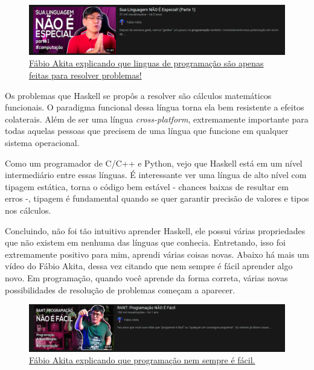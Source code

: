 \documentclass[
  12pt,				         %
  oneside,			       %
  a4paper,			       %
  english,		       	 %
  brazil,			      	 %
]{abntex2}
\begin{document}
\begin{apendicesenv}
        \begin{figure}[ht]
          \includegraphics[width =\textwidth]{fabio_akita_lingua.png}
          \caption{\href{https://www.youtube.com/watch?v=p9-WuJbVHHc}{Fábio Akita explicando que linguas de programação são apenas feitas para resolver problemas!}}
        \end{figure}

        Os problemas que Haskell se propôs a resolver são cálculos matemáticos
        funcionais. O paradigma funcional dessa língua torna ela bem resistente a efeitos colaterais. Além de ser uma língua
        \emph{cross-platform}, extremamente importante para todas aquelas pessoas que precisem de uma língua que funcione
        em qualquer sistema operacional. 

        Como um programador de C/C++ e Python, vejo que Haskell está em um nível intermediário entre essas línguas.
        É interessante ver uma língua de alto nível com tipagem estática, torna o código bem estável - chances baixas de 
        resultar em erros -, tipagem é fundamental quando se quer garantir precisão de valores e tipos nos cálculos.

        Concluindo, não foi tão intuitivo aprender Haskell, ele possui várias propriedades que não existem em nenhuma das línguas
        que conhecia. Entretando, isso foi extremamente positivo para mim, aprendi várias coisas novas. Abaixo há
        mais um vídeo do Fábio Akita, dessa vez citando que nem sempre é fácil aprender algo novo. Em programação,
        quando você aprende da forma correta, várias novas possibilidades de resolução de problemas começam a aparecer.

        \begin{figure}[ht]
          \includegraphics[width =\textwidth]{fabio_akita_programar_eh_dificil.png}
          \caption{\href{https://www.youtube.com/watch?v=V7oUDL7E1g4}{Fábio Akita explicando que programação nem sempre é fácil.}}
        \end{figure}


\end{apendicesenv}
\end{document}
